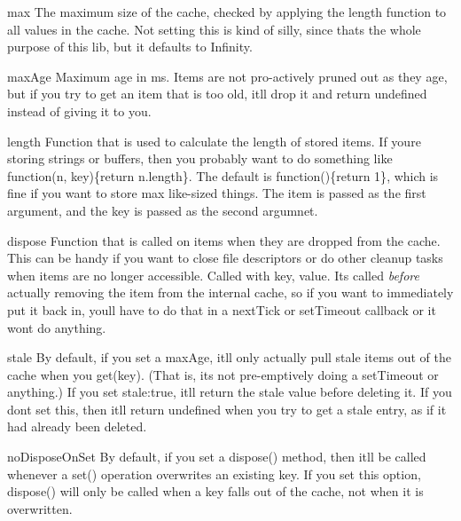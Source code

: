 \begin{DoxyItemize}
\item {\ttfamily max} The maximum size of the cache, checked by applying the length function to all values in the cache. Not setting this is kind of silly, since that\textquotesingle{}s the whole purpose of this lib, but it defaults to {\ttfamily Infinity}.
\item {\ttfamily max\+Age} Maximum age in ms. Items are not pro-\/actively pruned out as they age, but if you try to get an item that is too old, it\textquotesingle{}ll drop it and return undefined instead of giving it to you.
\item {\ttfamily length} Function that is used to calculate the length of stored items. If you\textquotesingle{}re storing strings or buffers, then you probably want to do something like {\ttfamily function(n, key)\{return n.\+length\}}. The default is {\ttfamily function()\{return 1\}}, which is fine if you want to store {\ttfamily max} like-\/sized things. The item is passed as the first argument, and the key is passed as the second argumnet.
\item {\ttfamily dispose} Function that is called on items when they are dropped from the cache. This can be handy if you want to close file descriptors or do other cleanup tasks when items are no longer accessible. Called with {\ttfamily key, value}. It\textquotesingle{}s called {\itshape before} actually removing the item from the internal cache, so if you want to immediately put it back in, you\textquotesingle{}ll have to do that in a {\ttfamily next\+Tick} or {\ttfamily set\+Timeout} callback or it won\textquotesingle{}t do anything.
\item {\ttfamily stale} By default, if you set a {\ttfamily max\+Age}, it\textquotesingle{}ll only actually pull stale items out of the cache when you {\ttfamily get(key)}. (That is, it\textquotesingle{}s not pre-\/emptively doing a {\ttfamily set\+Timeout} or anything.) If you set {\ttfamily stale\+:true}, it\textquotesingle{}ll return the stale value before deleting it. If you don\textquotesingle{}t set this, then it\textquotesingle{}ll return {\ttfamily undefined} when you try to get a stale entry, as if it had already been deleted.
\item {\ttfamily no\+Dispose\+On\+Set} By default, if you set a {\ttfamily dispose()} method, then it\textquotesingle{}ll be called whenever a {\ttfamily set()} operation overwrites an existing key. If you set this option, {\ttfamily dispose()} will only be called when a key falls out of the cache, not when it is overwritten.
\end{DoxyItemize}


